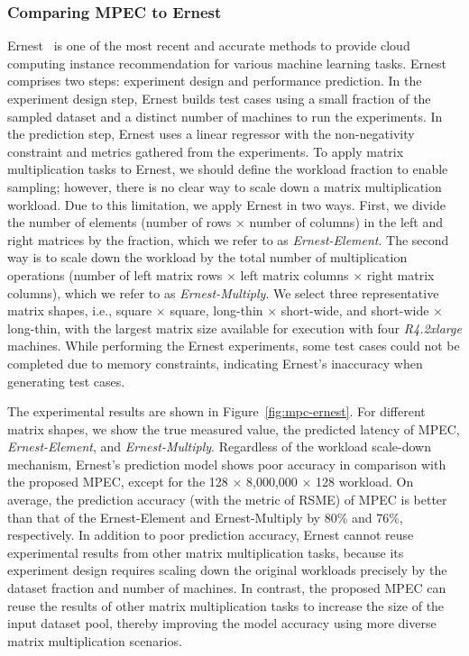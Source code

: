 \documentclass[10pt, conference, compsocconf]{IEEEtran}
\begin{document}
\subsubsection{Comparing MPEC to Ernest}
Ernest~\cite{ernest} is one of the most recent and accurate methods to provide cloud computing instance recommendation for various machine learning tasks. Ernest comprises two steps: experiment design and performance prediction. In the experiment design step, Ernest builds test cases using a small fraction of the sampled dataset and a distinct number of machines to run the experiments. In the prediction step, Ernest uses a linear regressor with the non-negativity constraint and metrics gathered from the experiments. To apply matrix multiplication tasks to Ernest, we should define the workload fraction to enable sampling; however, there is no clear way to scale down a matrix multiplication workload. Due to this limitation, we apply Ernest in two ways. First, we divide the number of elements (number of rows $\times$ number of columns) in the left and right matrices by the fraction, which we refer to as \textit{Ernest-Element}. The second way is to scale down the workload by the total number of multiplication operations (number of left matrix rows $\times$ left matrix columns $\times$ right matrix columns), which we refer to as \textit{Ernest-Multiply}. We select three representative matrix shapes, i.e., square $\times$ square, long-thin $\times$ short-wide, and short-wide $\times$ long-thin, with the largest matrix size available for execution with four \textit{R4.2xlarge} machines. While performing the Ernest experiments, some test cases could not be completed due to memory constraints, indicating Ernest's inaccuracy when generating test cases.

The experimental results are shown in Figure~\ref{fig:mpc-ernest}. For different matrix shapes, we show the true measured value, the predicted latency of MPEC, \textit{Ernest-Element}, and \textit{Ernest-Multiply}. Regardless of the workload scale-down mechanism, Ernest's prediction model shows poor accuracy in comparison with the proposed MPEC, except for the 128 $\times$ 8,000,000 $\times$ 128 workload. On average, the prediction accuracy (with the metric of RSME) of MPEC is better than that of the Ernest-Element and Ernest-Multiply by 80\% and 76\%, respectively. In addition to poor prediction accuracy, Ernest cannot reuse experimental results from other matrix multiplication tasks, because its experiment design requires scaling down the original workloads precisely by the dataset fraction and number of machines. In contrast, the proposed MPEC can reuse the results of other matrix multiplication tasks to increase the size of the input dataset pool, thereby improving the model accuracy using more diverse matrix multiplication scenarios.
\end{document}
